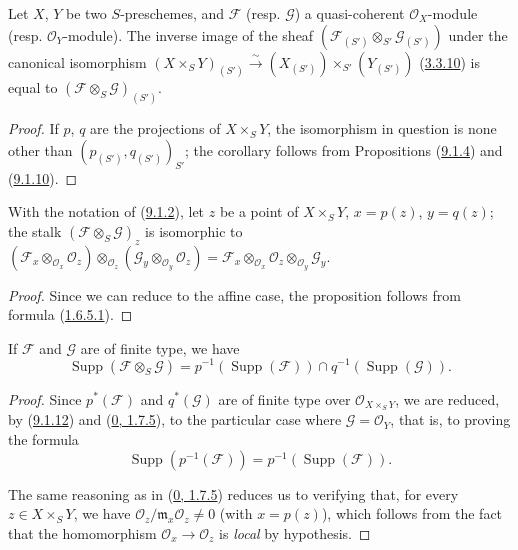 \begin{corollary}[9.1.11]
\label{I.9.1.11}
Let $X$, $Y$ be two $S$-preschemes, and $\mathscr{F}$ (resp. $\mathscr{G}$)
a quasi-coherent $\mathscr{O}_X$-module (resp. $\mathscr{O}_Y$-module).
The inverse image of the sheaf
$(\mathscr{F}_{(S')}\otimes_{S'}\mathscr{G}_{(S')})$ under the canonical
isomorphism
$(X\times_S Y)_{(S')}\xrightarrow{\sim}
(X_{(S')})\times_{S'}(Y_{(S')})$
(\hyperref[I.3.3.10]{3.3.10}) is equal to
$(\mathscr{F}\otimes_S\mathscr{G})_{(S')}$.
\end{corollary}

\begin{proof}
If $p$, $q$ are the projections of $X\times_S Y$, the isomorphism in
question is none other than $(p_{(S')},q_{(S')})_{S'}$; the corollary
follows from Propositions (\hyperref[I.9.1.4]{9.1.4}) and
(\hyperref[I.9.1.10]{9.1.10}).
\end{proof}

\begin{proposition}[9.1.12]
\label{I.9.1.12}
With the notation of (\hyperref[I.9.1.2]{9.1.2}), let $z$ be a point of
$X\times_S Y$, $x=p(z)$, $y=q(z)$; the stalk
$(\mathscr{F}\otimes_S\mathscr{G})_z$ is isomorphic to
$(\mathscr{F}_x\otimes_{\mathscr{O}_x}\mathscr{O}_z)
\otimes_{\mathscr{O}_z}
(\mathscr{G}_y\otimes_{\mathscr{O}_y}\mathscr{O}_z)
=\mathscr{F}_x\otimes_{\mathscr{O}_x}\mathscr{O}_z
\otimes_{\mathscr{O}_y}\mathscr{G}_y$.
\end{proposition}

\begin{proof}
Since we can reduce to the affine case, the proposition follows from
formula (\hyperref[I.1.6.5.1]{1.6.5.1}).
\end{proof}

\begin{corollary}[9.1.13]
\label{I.9.1.13}
If $\mathscr{F}$ and $\mathscr{G}$ are of finite type, we have
\[
  \operatorname{Supp}(\mathscr{F}\otimes_S\mathscr{G})
  =p^{-1}(\operatorname{Supp}(\mathscr{F}))
  \cap q^{-1}(\operatorname{Supp}(\mathscr{G})).
\]
\end{corollary}

\begin{proof}
Since $p^*(\mathscr{F})$ and $q^*(\mathscr{G})$ are of finite type over
$\mathscr{O}_{X\times_S Y}$, we are reduced, by
(\hyperref[I.9.1.12]{9.1.12}) and
(\hyperref[0.1.7.5]{0, 1.7.5}), to the particular case where
$\mathscr{G}=\mathscr{O}_Y$, that is, to proving the formula
\[
  \operatorname{Supp}(p^{-1}(\mathscr{F}))
  =p^{-1}(\operatorname{Supp}(\mathscr{F})).
  \tag{9.1.13.1}\label{I.9.1.13.1}
\]

The same reasoning as in (\hyperref[0.1.7.5]{0, 1.7.5}) reduces us to
verifying that, for every $z\in X\times_S Y$, we have
$\mathscr{O}_z/\mathfrak{m}_x\mathscr{O}_z\neq0$ (with $x=p(z)$), which
follows from the fact that the homomorphism
$\mathscr{O}_x\to\mathscr{O}_z$ is \emph{local} by hypothesis.
\end{proof}

